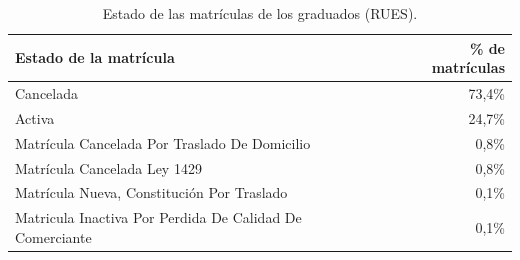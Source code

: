 \begin{table}[H]\centering\footnotesize
\caption{Estado de las matrículas de los graduados (RUES).}\label{tab:rues_estado}
\begin{tabular}{lr}
\toprule
\rowcolor{ustaazul}\textbf{\color{white}Estado de la matrícula} & \textbf{\color{white}\% de matrículas} \\
\midrule
Cancelada & 73,4\% \\
Activa & 24,7\% \\
Matrícula Cancelada Por Traslado De Domicilio & 0,8\% \\
Matrícula Cancelada Ley 1429 & 0,8\% \\
Matrícula Nueva, Constitución Por Traslado & 0,1\% \\
Matricula Inactiva Por Perdida De Calidad De Comerciante & 0,1\% \\
\bottomrule
\end{tabular}
\end{table}